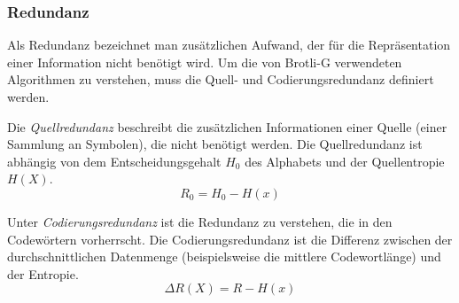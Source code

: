 \subsubsection*{Redundanz}
Als Redundanz bezeichnet man zusätzlichen Aufwand, der für die Repräsentation einer Information nicht benötigt wird.
Um die von Brotli-G verwendeten Algorithmen zu verstehen, muss die Quell- und Codierungsredundanz definiert werden.

Die \textit{Quellredundanz} beschreibt die zusätzlichen Informationen einer Quelle (einer Sammlung an Symbolen), die nicht benötigt werden.
Die Quellredundanz ist abhängig von dem Entscheidungsgehalt $\mathit{H_0}$ des Alphabets und der Quellentropie $\mathit{H(X)}$.
\begin{equation*}
R_0 = H_0 - H(x)
\end{equation*}

Unter \textit{Codierungsredundanz} ist die Redundanz zu verstehen, die in den Codewörtern vorherrscht.
Die Codierungsredundanz ist die Differenz zwischen der durchschnittlichen Datenmenge (beispielsweise die mittlere Codewortlänge) und der Entropie.
\begin{equation*}
\Delta R(X) = R - H(x)
\end{equation*}

\cite{Strutz2009}